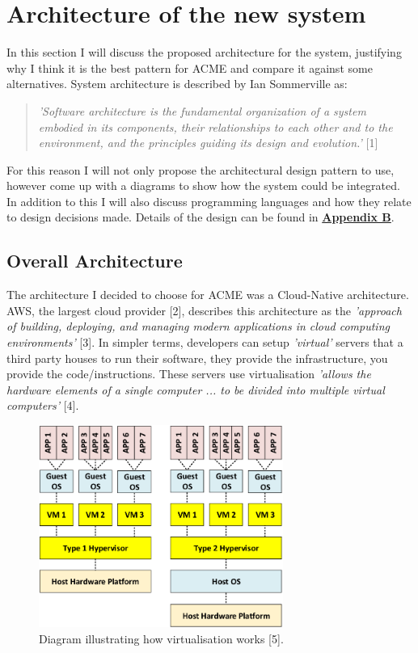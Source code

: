\section{Architecture of the new system}
  In this section I will discuss the proposed architecture for the system, justifying why I think it is the best pattern for ACME and compare it against 
  some alternatives. System architecture is described by Ian Sommerville as:
  \begin{quote}
    \textit{'Software architecture is the fundamental organization of a system embodied in its
    components, their relationships to each other and to the environment, and the principles
    guiding its design and evolution.'} [1]
  \end{quote}

  For this reason I will not only propose the architectural design pattern to use, however come up with a diagrams to show how the system could be integrated.
  In addition to this I will also discuss programming languages and how they relate to design decisions made. Details of the design can be found in 
  \hyperref[sec:AppendixB]{\textbf{Appendix B}}.

  \subsection{Overall Architecture}
  The architecture I decided to choose for ACME was a Cloud-Native architecture. AWS, the largest cloud provider [2], describes this architecture as the 
  \textit{'approach of building, deploying, and managing modern applications in cloud computing environments'} [3]. In simpler terms, developers can setup
  \textit{'virtual'} servers that a third party houses to run their software, they provide the infrastructure, you provide the code/instructions. These servers
  use virtualisation \textit{'allows the hardware elements of a single computer ... to be divided into multiple virtual computers'} [4]. 

  \begin{figure}[H]
    \centering
    \includegraphics[width=8cm]{assets/virtualisation.png}
    \caption{Diagram illustrating how virtualisation works [5].}
    \label{fig:virtualisation}
  \end{figure}

